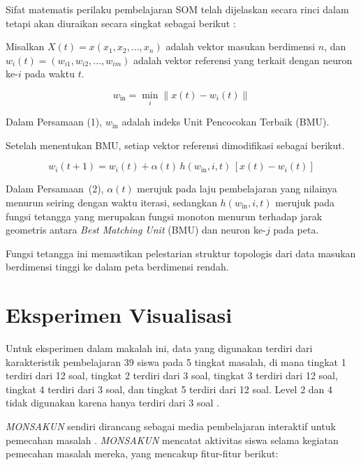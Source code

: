     Sifat matematis perilaku pembelajaran SOM telah dijelaskan secara rinci dalam \citep{Cabanes2012} tetapi akan diuraikan secara singkat sebagai berikut :

    Misalkan $X(t) = x(x_1, x_2, \ldots, x_n)$ adalah vektor masukan berdimensi $n$, dan
    $w_i(t) = (w_{i1}, w_{i2}, \ldots, w_{im})$ adalah vektor referensi yang terkait dengan neuron ke-$i$ pada waktu $t$.

    \[
        w_{\text{in}} = \min_i \| x(t) - w_i(t) \|
    \]

    Dalam Persamaan (1), $w_{\text{in}}$ adalah indeks Unit Pencocokan Terbaik (BMU).
    
    Setelah menentukan BMU, setiap vektor referensi dimodifikasi sebagai berikut.

    \[
        w_i(t + 1) = w_i(t) + \alpha(t) \, h(w_{\text{in}}, i, t) \, [x(t) - w_i(t)]
    \]

    Dalam Persamaan~(2), $\alpha(t)$ merujuk pada laju pembelajaran yang nilainya menurun seiring dengan waktu iterasi, sedangkan $h(w_{\text{in}}, i, t)$ merujuk pada fungsi tetangga yang merupakan fungsi monoton menurun terhadap jarak geometris antara \textit{Best Matching Unit} (BMU) dan neuron ke-$j$ pada peta. 

    Fungsi tetangga ini memastikan pelestarian struktur topologis dari data masukan berdimensi tinggi ke dalam peta berdimensi rendah.
    
\section{Eksperimen Visualisasi}

    Untuk eksperimen dalam makalah ini, data yang digunakan terdiri dari karakteristik pembelajaran 39 siswa pada 5 tingkat masalah, di mana tingkat 1 terdiri dari 12 soal, tingkat 2 terdiri dari 3 soal, tingkat 3 terdiri dari 12 soal, tingkat 4 terdiri dari 3 soal, dan tingkat 5 terdiri dari 12 soal. Level 2 dan 4 tidak digunakan karena hanya terdiri dari 3 soal \citep{Hirashima2007}.

    \textit{MONSAKUN} sendiri dirancang sebagai media pembelajaran interaktif untuk pemecahan masalah \citep{Hirashima2014}. \textit{MONSAKUN} mencatat aktivitas siswa selama kegiatan pemecahan masalah mereka, yang mencakup fitur-fitur berikut:

